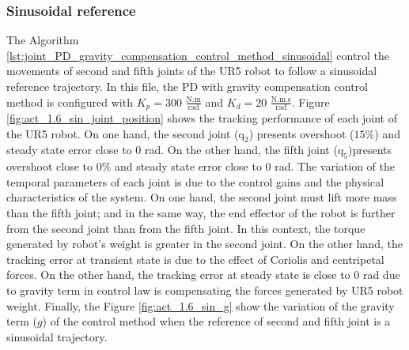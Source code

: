 \subsubsection{Sinusoidal reference}
The Algorithm \ref{lst:joint_PD_gravity_compensation_control_method_sinusoidal} control the movements of second and fifth joints of the UR5 robot to follow a sinusoidal reference trajectory. In this file, the PD with gravity compensation control method is configured with $K_p=300$ $\mathrm{\frac{N.m}{rad}}$ and $K_d= 20 $ $\mathrm{\frac{N.m.s}{rad}}$. Figure \ref{fig:act_1.6_sin_joint_position} shows the tracking performance of each joint of the UR5 robot. On one hand, the second joint ($\mathrm{q}_2$) presents overshoot ($15\%$) and steady state error close to $0$ rad. On the other hand, the fifth joint ($\mathrm{q}_5$)presents overshoot close to $0\%$ and steady state error close to $0$ rad. The variation of the temporal parameters of each joint is due to the control gains and the physical characteristics of the system. On one hand, the second joint must lift more mass than the fifth joint; and in the same way, the end effector of the robot is further from the second joint than from the fifth joint. In this context, the torque generated by robot's weight is greater in the second joint. On the other hand, the tracking error at transient state is due to the effect of Coriolis and centripetal forces. On the other hand, the tracking error at steady state is close to $0$ rad due to gravity term in control law is compensating the forces generated by UR5 robot weight. Finally, the Figure \ref{fig:act_1.6_sin_g} show the variation of the gravity term ($g$) of the control method when the reference of second and fifth joint is a sinusoidal trajectory. \vspace{5px}

